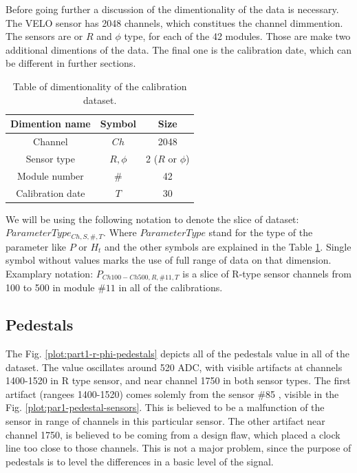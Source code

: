 Before going further a discussion of the dimentionality of the data is necessary. The VELO sensor has 2048 channels, which constitues the channel dimmention. The sensors are or $R$ and $\phi$ type, for each of the 42 modules. Those are make two additional dimentions of the data. The final one is the calibration date, which can be different in further sections.

\begin{table}[h]
\begin{center}
\begin{tabular}{ |c|c|c| }
\hline
Dimention name & Symbol & Size\\
\hline
Channel & $Ch$ & 2048\\
Sensor type & ${R, \phi}$ & 2 ($R$ or $\phi$) \\
Module number & $\#$ & 42 \\
Calibration date & $T$ & 30\\
\hline
\end{tabular}
\caption{\label{tab:velo_dimentionality}Table of dimentionality of the calibration dataset.}
\end{center}
\end{table}

We will be using the following notation to denote the slice of dataset: $ParameterType_{Ch, S, \#, T}$. Where $ParameterType$ stand for the type of the parameter like $P$ or $H_t$ and the other symbols are explained in the Table \ref{tab:velo_dimentionality}. Single symbol without values marks the use of full range of data on that dimension. Examplary notation: $P_{Ch100-Ch500, R, \#11, T}$ is a slice of R-type sensor channels from 100 to 500 in module $\#11$ in all of the calibrations.

\subsection{Pedestals}

The Fig. \ref{plot:part1-r-phi-pedestals} depicts all of the pedestals value in all of the dataset. The value oscillates around 520 ADC, with visible artifacts at channels 1400-1520 in R type sensor, and near channel 1750 in both sensor types. The first artifact (rangees 1400-1520) comes solemly from the sensor \#85 
, visible in the Fig. \ref{plot:par1-pedestal-sensors}. This is believed to be a malfunction of the sensor in range of channels in this particular sensor. 
The other artifact near channel 1750, is believed to be coming from a design flaw, which placed a clock line too close to those channels. 
This is not a major problem, since the purpose of pedestals is to level the differences in a basic level of the signal.

